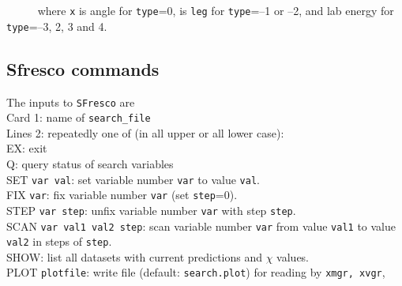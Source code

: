 \documentclass[11pt]{article}
\begin{document}
~~~~~ where {\tt x} is angle for {\tt type}=0, is {\tt leg} for {\tt type}=--1 or --2, and lab energy for {\tt type}=--3, 2, 3 and 4.\\

\subsection{Sfresco commands}

The inputs to {\tt SFresco} are\\
Card 1: name of {\tt search\_file}\\

Lines 2: repeatedly one of (in all upper or all lower case):
\\ EX: exit
\\ Q: query status of search variables
\\ SET {\tt var val}: set variable number {\tt var} to value {\tt val}.
\\ FIX {\tt var}: fix variable number {\tt var} (set {\tt step}=0).
\\ STEP {\tt var step}: unfix variable number {\tt var} with step {\tt step}.
\\ SCAN {\tt var val1 val2 step}: scan variable number {\tt var}
from value {\tt val1} to value {\tt val2} in steps of {\tt step}.
\\ SHOW: list all datasets with current predictions and $\chi$ values.
\\ PLOT {\tt plotfile}: write file (default: {\tt search.plot}) for reading by {\tt xmgr, xvgr},
\end{document}

